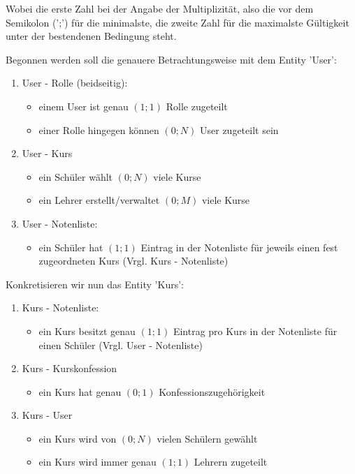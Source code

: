 Wobei die erste Zahl bei der Angabe der Multiplizität, also die vor dem Semikolon (';') für die minimalste, die zweite Zahl für die maximalste Gültigkeit unter der bestendenen Bedingung steht.

Begonnen werden soll die genauere Betrachtungsweise mit dem Entity 'User':

\begin{enumerate}
  \item User - Rolle (beidseitig):	
    \begin{itemize}
      \item einem User ist genau $(1;1)$ Rolle zugeteilt
      \item einer Rolle hingegen können $(0;N)$ User zugeteilt sein
    \end{itemize}

  \item User - Kurs
    \begin{itemize}
      \item ein Schüler wählt $(0;N)$ viele Kurse
      \item ein Lehrer erstellt/verwaltet $(0;M)$ viele Kurse
    \end{itemize}
  
  \item User - Notenliste:
    \begin{itemize}
      \item ein Schüler hat $(1;1)$ Eintrag in der Notenliste für jeweils einen fest zugeordneten Kurs (Vrgl. Kurs - Notenliste)
    \end{itemize}

\end{enumerate}

Konkretisieren wir nun das Entity 'Kurs':

\begin{enumerate}
  \item Kurs - Notenliste:
  \begin{itemize}
    \item ein Kurs besitzt genau $(1;1)$ Eintrag pro Kurs in der Notenliste für einen Schüler (Vrgl. User - Notenliste)
  \end{itemize}
  
  \item Kurs - Kurskonfession	
    \begin{itemize}
      \item ein Kurs hat genau $(0;1)$ Konfessionszugehörigkeit
    \end{itemize}

  \item Kurs - User	
    \begin{itemize}
      \item ein Kurs wird von $(0;N)$ vielen Schülern gewählt
      \item ein Kurs wird immer genau $(1;1)$ Lehrern zugeteilt
    \end{itemize}
\end{enumerate}

